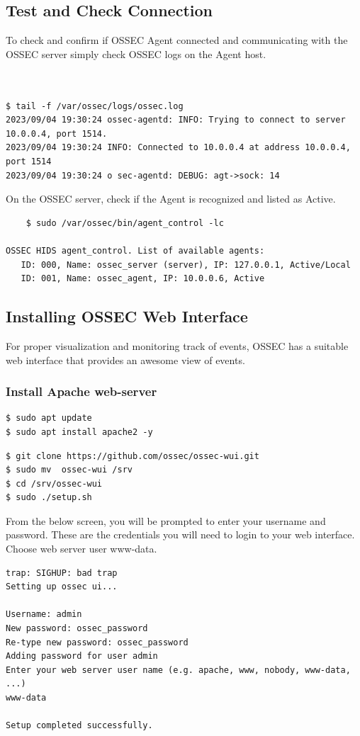 \documentclass{article}
\begin{document}
\subsection{Test and Check Connection}
    To check and confirm if OSSEC Agent connected and communicating with the OSSEC server simply check OSSEC logs on the Agent host.
\begin{verbatim}


$ tail -f /var/ossec/logs/ossec.log
2023/09/04 19:30:24 ossec-agentd: INFO: Trying to connect to server 10.0.0.4, port 1514.
2023/09/04 19:30:24 INFO: Connected to 10.0.0.4 at address 10.0.0.4, port 1514
2023/09/04 19:30:24 o sec-agentd: DEBUG: agt->sock: 14
\end{verbatim}
On the OSSEC server, check if the Agent is recognized and listed as Active.
\begin{verbatim}
    $ sudo /var/ossec/bin/agent_control -lc

OSSEC HIDS agent_control. List of available agents:
   ID: 000, Name: ossec_server (server), IP: 127.0.0.1, Active/Local
   ID: 001, Name: ossec_agent, IP: 10.0.0.6, Active
\end{verbatim}
\subsection{Installing OSSEC Web Interface}
For proper visualization and monitoring track of events, OSSEC has a suitable web interface that provides an awesome view of events.

\subsubsection{Install Apache web-server}
\begin{verbatim}
$ sudo apt update
$ sudo apt install apache2 -y
\end{verbatim}
\begin{verbatim}
$ git clone https://github.com/ossec/ossec-wui.git
$ sudo mv  ossec-wui /srv
$ cd /srv/ossec-wui
$ sudo ./setup.sh
\end{verbatim}
From the below screen, you will be prompted to enter your username and password. These are the credentials you will need to login to your web interface. Choose web server user www-data.

\begin{verbatim}
trap: SIGHUP: bad trap
Setting up ossec ui...

Username: admin
New password: ossec_password
Re-type new password: ossec_password
Adding password for user admin
Enter your web server user name (e.g. apache, www, nobody, www-data, ...)
www-data

Setup completed successfully.
\end{verbatim}
\end{document}
